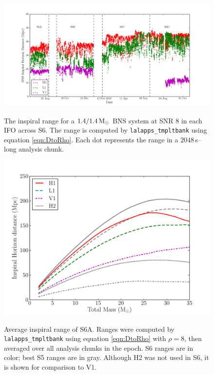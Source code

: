 \begin{landscape}
\begin{figure}[p]
\begin{center}
\label{fig:s6_insprange_v_time}
\includegraphics[width=9in]{figures/s6-hzrange_v_time.png}
\end{center}
\caption{The inspiral range for a $1.4/1.4\,\mathrm{M_\odot}$ \ac{BNS} system at \ac{SNR} $8$ in each \ac{IFO} across \ac{S6}. The range is computed by \texttt{lalapps\_tmpltbank} using equation \ref{eqn:DtoRho}. Each dot represents the range in a $2048\,$s--long analysis chunk.}
\end{figure}
\end{landscape}

\clearpage

\begin{figure}[p]
\begin{center}
\label{fig:s6a_insprange}
\includegraphics[width=6in]{figures/s6a_insprange.pdf}
\end{center}
\caption{Average inspiral range of S6A. Ranges were computed by \texttt{lalapps\_tmpltbank} using equation \ref{eqn:DtoRho} with $\rho=8$, then averaged over all analysis chunks in the epoch. S6 ranges are in color; best S5 ranges are in gray. Although H2 was not used in \ac{S6}, it is shown for comparison to V1.}
\end{figure}

